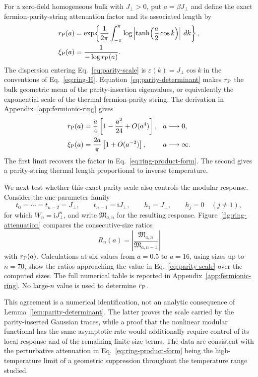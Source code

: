 \documentclass[aps,prb,preprint,nofootinbib,longbibliography]{revtex4-2}
\newcommand{\Mmod}{\mathfrak{M}}
\newcommand{\ii}{\mathrm{i}}
\begin{document}
For a zero-field homogeneous bulk with $J_\perp>0$, put
$a=\beta J_\perp$ and define
the exact
fermion-parity-string attenuation factor and its associated length by
\begin{align}
 r_{\rm P}(a)
 &=\exp\!\left\{\frac{1}{2\pi}\int_{-\pi}^{\pi}
 \log\left|\tanh\!\left(\frac a2\cos k\right)\right|\,dk\right\},
 \label{eq:parity-scale}\\
 \xi_{\rm P}(a)&=\frac{1}{-\log r_{\rm P}(a)}.
 \label{eq:parity-length}
\end{align}
The dispersion entering Eq.~\eqref{eq:parity-scale} is
$\varepsilon(k)=J_\perp\cos k$ in the conventions of
Eq.~\eqref{eq:ring-H}.  Equation~\eqref{eq:parity-determinant} makes
$r_{\rm P}$ the bulk geometric mean of the parity-insertion eigenvalues,
or equivalently the exponential scale of the thermal fermion-parity string.
The derivation in Appendix~\ref{app:fermionic-ring} gives
\begin{align}
 r_{\rm P}(a)
 &=\frac a4\left[1-\frac{a^2}{24}+O(a^4)\right],
 &&a\longrightarrow0,
 \label{eq:parity-high-T}\\
 \xi_{\rm P}(a)
 &=\frac{2a}{\pi}\left[1+O(a^{-2})\right],
 &&a\longrightarrow\infty.
 \label{eq:parity-low-T}
\end{align}
The first limit recovers the factor in Eq.~\eqref{eq:ring-product-form}.
The second gives a parity-string thermal length proportional to inverse
temperature.

We next test whether this exact parity scale also controls the modular
response.  Consider the one-parameter family
\begin{equation}
 t_0=\cdots=t_{n-2}=J_\perp,\qquad
 t_{n-1}=\ii J_\perp,\qquad
 h_1=J_\perp,\qquad h_j=0\quad(j\ne1),
 \label{eq:attenuation-family}
\end{equation}
for which $W_n=\ii J_\perp^n$, and write $\Mmod_{a,n}$ for the resulting
response.  Figure~\ref{fig:ring-attenuation} compares the consecutive-size
ratios
\begin{equation}
 R_n(a)=\left|\frac{\Mmod_{a,n}}{\Mmod_{a,n-1}}\right|
 \label{eq:modular-size-ratio}
\end{equation}
with $r_{\rm P}(a)$.  Calculations at six values from $a=0.5$ to $a=16$,
using sizes up to $n=70$, show the ratios approaching the value in
Eq.~\eqref{eq:parity-scale} over the computed sizes.  The full numerical table
is reported in Appendix~\ref{app:fermionic-ring}.  No large-$n$ value is used
to determine $r_{\rm P}$.

This agreement is a numerical identification, not an analytic consequence
of Lemma~\ref{lem:parity-determinant}.  The latter proves the scale carried by
the parity-inserted Gaussian traces, while a proof that the nonlinear modular
functional has the same asymptotic rate would additionally require control of
its local response and of the remaining finite-size terms.  The data are
consistent with the perturbative attenuation in
Eq.~\eqref{eq:ring-product-form} being the high-temperature limit of a
geometric suppression throughout the temperature range studied.
\end{document}
